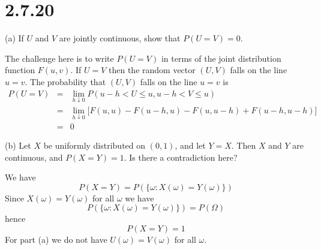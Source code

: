 \section*{2.7.20}
(a) If $U$ and $V$ are jointly continuous, show that $P(U=V)=0$.

\bigskip
\noindent
The challenge here is to write $P(U=V)$ in terms of the joint
distribution function $F(u,v)$.
If $U=V$ then the random vector $(U,V)$ falls on the line $u=v$.
The probability that $(U,V)$ falls on the line $u=v$ is
\begin{eqnarray*}
P(U=V)&=&\lim_{h\downarrow0}P(u-h<U\le u,u-h<V\le u) \\
&=&\lim_{h\downarrow0}\bigg[
F(u,u)-F(u-h,u)-F(u,u-h)+F(u-h,u-h)\bigg]\\
&=&0
\end{eqnarray*}

\bigskip
\noindent
(b) Let $X$ be uniformly distributed on $(0,1)$, and let
$Y=X$. Then $X$ and $Y$ are continuous, and $P(X=Y)=1$.
Is there a contradiction here?

\bigskip
\noindent
We have
$$P(X=Y)=P(\{\omega:X(\omega)=Y(\omega)\})$$
Since $X(\omega)=Y(\omega)$ for all $\omega$ we have
$$P(\{\omega:X(\omega)=Y(\omega)\})=P(\Omega)$$
hence
$$P(X=Y)=1$$
For part (a) we do not have $U(\omega)=V(\omega)$ for all $\omega$.

